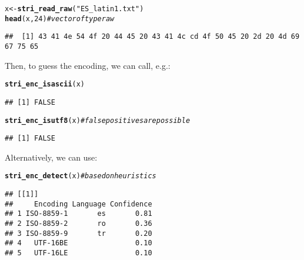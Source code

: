 \documentclass[nojss]{jss}\usepackage[]{graphicx}\usepackage[]{xcolor}
\makeatletter
\newcommand{\hlnum}[1]{\textcolor[rgb]{0.686,0.059,0.569}{#1}}%
\newcommand{\hlstr}[1]{\textcolor[rgb]{0.192,0.494,0.8}{#1}}%
\newcommand{\hlcom}[1]{\textcolor[rgb]{0.678,0.584,0.686}{\textit{#1}}}%
\newcommand{\hlstd}[1]{\textcolor[rgb]{0.345,0.345,0.345}{#1}}%
\newcommand{\hlkwb}[1]{\textcolor[rgb]{0.69,0.353,0.396}{#1}}%
\newcommand{\hlkwd}[1]{\textcolor[rgb]{0.737,0.353,0.396}{\textbf{#1}}}%
\newenvironment{kframe}{%
 \def\at@end@of@kframe{}%
 \ifinner\ifhmode%
  \def\at@end@of@kframe{\end{minipage}}%
  \begin{minipage}{\columnwidth}%
 \fi\fi%
 \def\FrameCommand##1{\hskip\@totalleftmargin \hskip-\fboxsep
 \colorbox{shadecolor}{##1}\hskip-\fboxsep
     \hskip-\linewidth \hskip-\@totalleftmargin \hskip\columnwidth}%
 \MakeFramed {\advance\hsize-\width
   \@totalleftmargin\z@ \linewidth\hsize
   \@setminipage}}%
 {\par\unskip\endMakeFramed%
 \at@end@of@kframe}
\newenvironment{knitrout}{}{} %
\makeatother
\begin{document}
\begin{knitrout}
\color{fgcolor}\begin{kframe}
\begin{alltt}
\hlstd{x} \hlkwb{<-} \hlkwd{stri_read_raw}\hlstd{(}\hlstr{"ES_latin1.txt"}\hlstd{)}
\hlkwd{head}\hlstd{(x,} \hlnum{24}\hlstd{)}  \hlcom{# vector of type raw}
\end{alltt}
\begin{verbatim}
##  [1] 43 41 4e 54 4f 20 44 45 20 43 41 4c cd 4f 50 45 20 2d 20 4d 69 67 75 65
\end{verbatim}
\end{kframe}
\end{knitrout}

Then, to guess the encoding, we can call, e.g.:

\begin{knitrout}
\color{fgcolor}\begin{kframe}
\begin{alltt}
\hlkwd{stri_enc_isascii}\hlstd{(x)}
\end{alltt}
\begin{verbatim}
## [1] FALSE
\end{verbatim}
\begin{alltt}
\hlkwd{stri_enc_isutf8}\hlstd{(x)}   \hlcom{# false positives are possible}
\end{alltt}
\begin{verbatim}
## [1] FALSE
\end{verbatim}
\end{kframe}
\end{knitrout}

\noindent
Alternatively, we can use:

\begin{knitrout}
\color{fgcolor}\begin{kframe}
\begin{alltt}
\hlkwd{stri_enc_detect}\hlstd{(x)}  \hlcom{# based on heuristics}
\end{alltt}
\begin{verbatim}
## [[1]]
##     Encoding Language Confidence
## 1 ISO-8859-1       es       0.81
## 2 ISO-8859-2       ro       0.36
## 3 ISO-8859-9       tr       0.20
## 4   UTF-16BE                0.10
## 5   UTF-16LE                0.10
\end{verbatim}
\end{kframe}
\end{knitrout}
\end{document}
